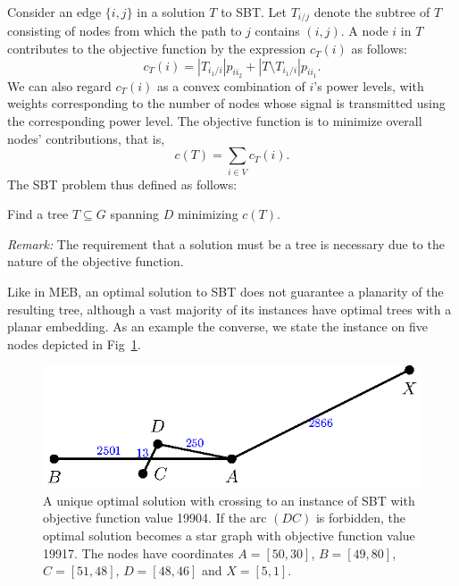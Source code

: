 Consider an edge $\{i,j\}$ in a solution $T$ to SBT.
Let $T_{i/j}$ denote the subtree of $T$ consisting of nodes from which the path to $j$ contains $(i,j)$. 
A node $i$ in $T$ contributes to the objective function by the expression $c_T(i)$ as follows:
\begin{equation}\label{eq:sbtnodecontr}
c_T(i)=|T_{i_1/i}|p_{ii_2} + |T\setminus T_{i_1/i}|p_{ii_1}.
\end{equation}
We can also regard $c_T(i)$ as a convex combination of $i$'s power levels, with weights corresponding to the number of nodes whose signal is transmitted using the corresponding power level.
The objective function is to minimize overall nodes' contributions, that is,
\begin{equation}
c(T)=\sum\limits_{i\in V}c_T(i).
\label{eq:sbtcost}
\end{equation}
The SBT problem thus defined as follows:
\begin{problem}
	Find a tree $T\subseteq G$ spanning $D$ minimizing $c(T)$.%
\end{problem}

\emph{Remark:} The requirement that a solution must be a tree is necessary due to the nature of the objective function.

Like in MEB, an optimal solution to SBT does not guarantee a planarity of the resulting tree, although a vast majority of its instances have optimal trees with a planar embedding. 
As an example the converse, we state the instance on five nodes depicted in Fig~\ref{fig:sbtnonplanar}.
\begin{figure}[htb!]
  \centering
  \includegraphics[scale=1.4]{figurer/sbtnonplanar.eps}
  \caption{A unique optimal solution with crossing to an instance of SBT with objective function value 19904. 
  If the arc $(DC)$ is forbidden, the optimal solution becomes a star graph with objective function value 19917.
  The nodes have coordinates $A=[50,30]$, $B=[49,80]$, $C=[51,48]$, $D=[48,46]$ and $X=[5,1]$.}
  \label{fig:sbtnonplanar}
\end{figure}

